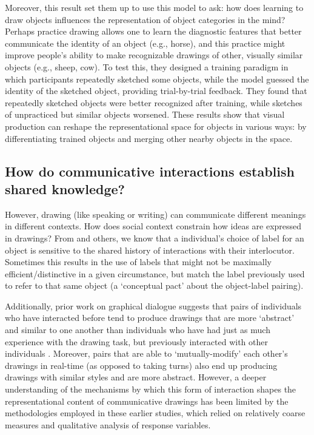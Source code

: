 \documentclass[12pt]{article}
\begin{document}
Moreover, this result set them up to use this model to ask: how does learning to draw objects influences the representation of object categories in the mind? Perhaps practice drawing allows one to learn the diagnostic features that better communicate the identity of an object (e.g., horse), and this practice might improve people's ability to make recognizable drawings of other, visually similar objects (e.g., sheep, cow). To test this, they designed a training paradigm in which participants repeatedly sketched some objects, while the model guessed the identity of the sketched object, providing trial-by-trial feedback. They found that repeatedly sketched objects were better recognized after training, while sketches of unpracticed but similar objects worsened. These results show that visual production can reshape the representational space for objects in various ways: by differentiating trained objects and merging other nearby objects in the space.

\subsection{How do communicative interactions establish shared knowledge?}

However, drawing (like speaking or writing) can communicate different meanings in different contexts. How does social context constrain how ideas are expressed in drawings? From  and others, we know that a individual's choice of label for an object is sensitive to the shared history of interactions with their interlocutor. Sometimes this results in the use of labels that might not be maximally efficient/distinctive in a given circumstance, but match the label previously used to refer to that same object (a ‘conceptual pact’ about the object-label pairing). 

Additionally, prior work on graphical dialogue suggests that pairs of individuals who have interacted before tend to produce drawings that are more `abstract' and similar to one another than individuals who have had just as much experience with the drawing task, but previously interacted with other individuals \cite{Healey:2007vq}. Moreover, pairs that are able to `mutually-modify' each other's drawings in real-time (as opposed to taking turns) also end up producing drawings with similar styles and are more abstract. However, a deeper understanding of the mechanisms by which this form of interaction shapes the representational content of communicative drawings has been limited by the methodologies employed in these earlier studies, which relied on relatively coarse measures and qualitative analysis of response variables. 
\end{document}
